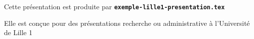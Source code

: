   \item Cette présentation est produite par \texttt{\textbf{exemple-lille1-presentation.tex}}
  \item Elle est conçue pour des présentations recherche ou administrative à l'Université de Lille 1
